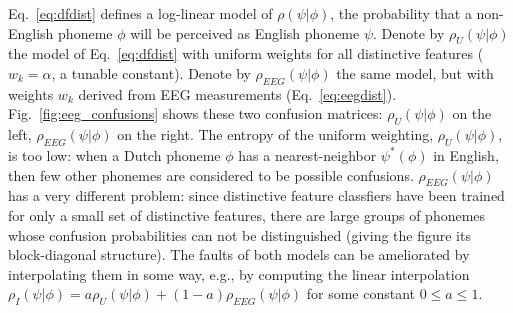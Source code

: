 Eq.~\ref{eq:dfdist} defines a log-linear model of $\rho(\psi|\phi)$, the
probability that a non-English phoneme $\phi$ will be perceived as English
phoneme $\psi$.  Denote by $\rho_U(\psi|\phi)$ the model of
Eq.~\ref{eq:dfdist} with uniform weights for all distinctive features
($w_k=\alpha$, a tunable constant).  Denote by $\rho_{EEG}(\psi|\phi)$ the
same model, but with weights $w_k$ derived from EEG measurements
(Eq.~\ref{eq:eegdist}).  Fig.~\ref{fig:eeg_confusions} shows these
two confusion matrices: $\rho_U(\psi|\phi)$ on the left,
$\rho_{EEG}(\psi|\phi)$ on the right. The entropy of the
uniform weighting, $\rho_U(\psi|\phi)$, is too low: when a Dutch
phoneme $\phi$ has a nearest-neighbor $\psi^*(\phi)$ in English, then
few other phonemes are considered to be possible confusions.
$\rho_{EEG}(\psi|\phi)$ has a very different problem: since distinctive
feature classfiers have been trained for only a small set of
distinctive features,
there are large groups of phonemes whose confusion
probabilities can not be distinguished (giving the figure its
block-diagonal structure).  The faults of both models can be
ameliorated by interpolating them in some way, e.g., by computing the
linear interpolation
$\rho_I(\psi|\phi)=a\rho_U(\psi|\phi)+(1-a)\rho_{EEG}(\psi|\phi)$ for some
constant $0\le a\le 1$.

